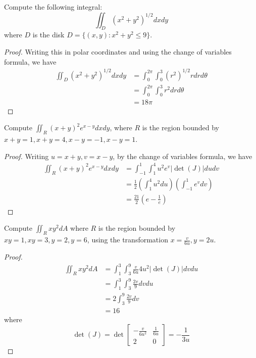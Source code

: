 \documentclass[openany]{book}
\begin{document}
\begin{prob}
    Compute the following integral:
    \begin{equation*}
        \iint_D(x^2+y^2)^{1/2}dxdy
    \end{equation*}
    where $D$ is the disk $D=\{(x,y):x^2+y^2\leq 9\}$.
\end{prob}
\begin{proof}
    Writing this in polar coordinates and using the change of variables formula, we have 
    \begin{align*}
        \iint_D(x^2+y^2)^{1/2}dxdy&=\int_0^{2\pi}\int_{0}^3 (r^2)^{1/2}rdrd\theta\\
        &=\int_0^{2\pi}\int_0^3r^2drd\theta\\
        &=18\pi
    \end{align*}
\end{proof}

\begin{prob}
    Compute $\iint_R(x+y)^2e^{x-y}dxdy$, where $R$ is the region bounded by $x+y=1, x+y=4, x-y=-1, x-y=1$.
\end{prob}
\begin{proof}
    Writing $u=x+y, v=x-y$, by the change of variables formula, we have 
    \begin{align*}
        \iint_R(x+y)^2e^{x-y}dxdy&=\int_{-1}^1\int_1^4u^2e^{v}|\det(J)|dudv\\
        &=\frac{1}{2}\left(\int_1^4u^2du\right)\left(\int_{-1}^1e^vdv\right)\\
        &=\frac{21}{2}\left(e-\frac{1}{e}\right)
    \end{align*}
\end{proof}


\begin{prob}
    Compute $\iint_Rxy^2dA$ where $R$ is the region bounded by $xy=1, xy=3, y=2, y=6$, using the transformation $x=\frac{v}{6u}, y=2u$.
\end{prob}
\begin{proof}
    \begin{align*}
        \iint_Rxy^2dA&=\int_1^3\int_3^9\frac{v}{6u}4u^2|\det(J)|dvdu\\
        &=\int_1^3\int_3^9\frac{2v}{9}dvdu\\
        &=2\int_3^9\frac{2v}{9}dv\\
        &=16
    \end{align*}
    where 
    \begin{equation*}
        \det(J)=\det\begin{bmatrix}
            -\frac{v}{6u^2}&\frac{1}{6u}\\
            2&0
        \end{bmatrix}=-\frac{1}{3u}
    \end{equation*}
\end{proof}
\end{document}

